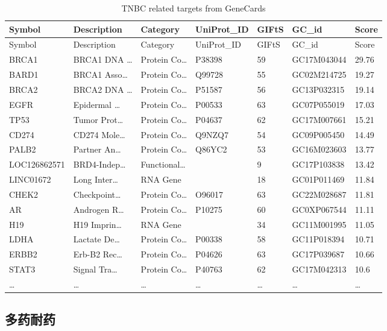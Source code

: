 \documentclass[
]{article}
\begin{document}
\begin{longtable}[]{@{}lllllll@{}}
\caption{\label{tab:TNBC-related-targets-from-GeneCards}TNBC related targets from GeneCards}\tabularnewline
\toprule
Symbol & Description & Category & UniProt\_ID & GIFtS & GC\_id & Score\tabularnewline
\midrule
\endfirsthead
\toprule
Symbol & Description & Category & UniProt\_ID & GIFtS & GC\_id & Score\tabularnewline
\midrule
\endhead
BRCA1 & BRCA1 DNA \ldots{} & Protein Co\ldots{} & P38398 & 59 & GC17M043044 & 29.76\tabularnewline
BARD1 & BRCA1 Asso\ldots{} & Protein Co\ldots{} & Q99728 & 55 & GC02M214725 & 19.27\tabularnewline
BRCA2 & BRCA2 DNA \ldots{} & Protein Co\ldots{} & P51587 & 56 & GC13P032315 & 19.14\tabularnewline
EGFR & Epidermal \ldots{} & Protein Co\ldots{} & P00533 & 63 & GC07P055019 & 17.03\tabularnewline
TP53 & Tumor Prot\ldots{} & Protein Co\ldots{} & P04637 & 62 & GC17M007661 & 15.21\tabularnewline
CD274 & CD274 Mole\ldots{} & Protein Co\ldots{} & Q9NZQ7 & 54 & GC09P005450 & 14.49\tabularnewline
PALB2 & Partner An\ldots{} & Protein Co\ldots{} & Q86YC2 & 53 & GC16M023603 & 13.77\tabularnewline
LOC126862571 & BRD4-Indep\ldots{} & Functional\ldots{} & & 9 & GC17P103838 & 13.42\tabularnewline
LINC01672 & Long Inter\ldots{} & RNA Gene & & 18 & GC01P011469 & 11.84\tabularnewline
CHEK2 & Checkpoint\ldots{} & Protein Co\ldots{} & O96017 & 63 & GC22M028687 & 11.81\tabularnewline
AR & Androgen R\ldots{} & Protein Co\ldots{} & P10275 & 60 & GC0XP067544 & 11.11\tabularnewline
H19 & H19 Imprin\ldots{} & RNA Gene & & 34 & GC11M001995 & 11.05\tabularnewline
LDHA & Lactate De\ldots{} & Protein Co\ldots{} & P00338 & 58 & GC11P018394 & 10.71\tabularnewline
ERBB2 & Erb-B2 Rec\ldots{} & Protein Co\ldots{} & P04626 & 63 & GC17P039687 & 10.66\tabularnewline
STAT3 & Signal Tra\ldots{} & Protein Co\ldots{} & P40763 & 62 & GC17M042313 & 10.6\tabularnewline
\ldots{} & \ldots{} & \ldots{} & \ldots{} & \ldots{} & \ldots{} & \ldots{}\tabularnewline
\bottomrule
\end{longtable}

\begin{center}\vspace{1.5cm}\end{center}

\hypertarget{ux591aux836fux8010ux836f}{%
\subsection{多药耐药}\label{ux591aux836fux8010ux836f}}
\end{document}
